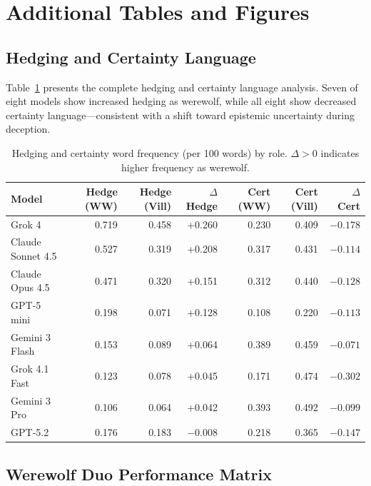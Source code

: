 \section{Additional Tables and Figures}
\label{app:additional}

\subsection{Hedging and Certainty Language}
\label{app:hedge_certainty}

Table~\ref{tab:hedge_full} presents the complete hedging and certainty language analysis. Seven of eight models show increased hedging as werewolf, while all eight show decreased certainty language---consistent with a shift toward epistemic uncertainty during deception.

\begin{table}[ht]
\caption{Hedging and certainty word frequency (per 100 words) by role. $\Delta > 0$ indicates higher frequency as werewolf.}
\label{tab:hedge_full}
\centering
\small
\begin{tabular}{lrrrrrr}
\toprule
\textbf{Model} & \textbf{Hedge (WW)} & \textbf{Hedge (Vill)} & \textbf{$\Delta$ Hedge} & \textbf{Cert (WW)} & \textbf{Cert (Vill)} & \textbf{$\Delta$ Cert} \\
\midrule
Grok 4                  & 0.719 & 0.458 & +0.260 & 0.230 & 0.409 & $-0.178$ \\
Claude Sonnet 4.5       & 0.527 & 0.319 & +0.208 & 0.317 & 0.431 & $-0.114$ \\
Claude Opus 4.5         & 0.471 & 0.320 & +0.151 & 0.312 & 0.440 & $-0.128$ \\
GPT-5 mini              & 0.198 & 0.071 & +0.128 & 0.108 & 0.220 & $-0.113$ \\
Gemini 3 Flash          & 0.153 & 0.089 & +0.064 & 0.389 & 0.459 & $-0.071$ \\
Grok 4.1 Fast           & 0.123 & 0.078 & +0.045 & 0.171 & 0.474 & $-0.302$ \\
Gemini 3 Pro            & 0.106 & 0.064 & +0.042 & 0.393 & 0.492 & $-0.099$ \\
GPT-5.2                 & 0.176 & 0.183 & $-0.008$ & 0.218 & 0.365 & $-0.147$ \\
\bottomrule
\end{tabular}
\end{table}


\subsection{Werewolf Duo Performance Matrix}
\label{app:duo_matrix}

